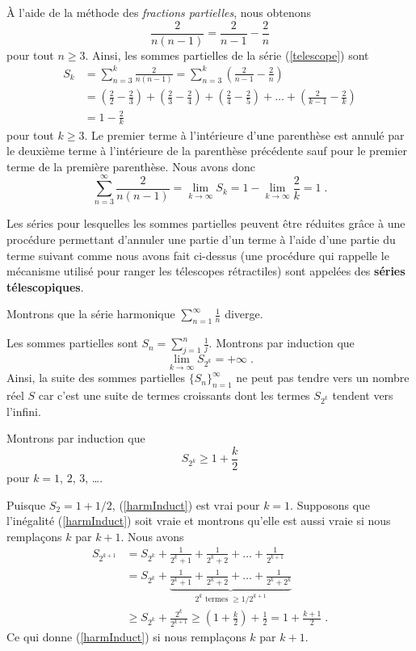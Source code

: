 {\begin{egg}
À l'aide de la méthode des {\em fractions partielles}, nous obtenons
\[
\frac{2}{n(n-1)} = \frac{2}{n-1} - \frac{2}{n}
\]
pour tout $n \geq 3$.  Ainsi, les sommes partielles de la série
(\ref{telescope}) sont
\begin{align*}
S_k &= \sum_{n=3}^k \frac{2}{n(n-1)}
= \sum_{n=3}^k \left( \frac{2}{n-1} - \frac{2}{n} \right) \\
&= \left( \frac{2}{2} - \frac{2}{3} \right) +
\left( \frac{2}{3} - \frac{2}{4} \right) +
\left( \frac{2}{4} - \frac{2}{5} \right) + \ldots
+\left( \frac{2}{k-1} - \frac{2}{k} \right) \\
&= 1 - \frac{2}{k}
\end{align*}
pour tout $k\geq 3$.  Le premier terme à l'intérieure d'une parenthèse est
annulé par le deuxième terme à l'intérieure de la parenthèse précédente sauf
pour le premier terme de la première parenthèse.  Nous avons donc
\[
\sum_{n=3}^\infty \frac{2}{n(n-1)} = \lim_{k\rightarrow \infty} S_k
= 1 - \lim_{k\rightarrow \infty} \frac{2}{k} = 1 \; .
\]

Les séries pour lesquelles les sommes partielles peuvent être réduites
grâce à une procédure permettant d'annuler une partie d'un terme à
l'aide d'une partie du terme suivant comme nous avons fait ci-dessus
(une procédure qui rappelle le mécanisme utilisé pour ranger les
télescopes rétractiles) sont appelées des {\bfseries séries télescopiques}.
\end{egg}

\begin{egg}[\theory\ \eng]
Montrons que la série harmonique
$\displaystyle \sum_{n=1}^\infty \frac{1}{n}$ diverge.

Les sommes partielles sont
$\displaystyle S_n = \sum_{j=1}^n \frac{1}{j}$.
Montrons par induction que
\[
\lim_{k\rightarrow \infty} S_{2^k} = +\infty \; .
\]
Ainsi, la suite des sommes partielles $\{S_n\}_{n=1}^\infty$ ne peut
pas tendre vers un nombre réel $S$ car c'est une suite de termes
croissants dont les termes $S_{2^k}$ tendent vers l'infini.

Montrons par induction que
\begin{equation}\label{harmInduct}
S_{2^k} \geq 1 + \frac{k}{2}
\end{equation}
pour $k=1$, $2$, $3$, \ldots.

Puisque $S_2 = 1 + 1/2$, (\ref{harmInduct}) est vrai pour
$k=1$.  Supposons que l'inégalité (\ref{harmInduct}) soit vraie et
montrons qu'elle est aussi vraie si nous remplaçons $k$ par $k+1$.  Nous avons
\begin{align*}
S_{2^{k+1}} &= S_{2^k} + \frac{1}{2^k+1} + \frac{1}{2^k+2} + \ldots
+ \frac{1}{2^{k+1}} \\
&= S_{2^k} + \underbrace{\frac{1}{2^k+1} + \frac{1}{2^k+2} + \ldots
+ \frac{1}{2^k+2^k}}_{2^k \text{ termes } \geq 1/2^{k+1}} \\
&\geq S_{2^k} + \frac{2^k}{2^{k+1}}
\geq \left(1+\frac{k}{2}\right) + \frac{1}{2}
= 1 + \frac{k+1}{2} \; .
\end{align*}
Ce qui donne (\ref{harmInduct}) si nous remplaçons $k$ par $k+1$.


\end{egg}}
